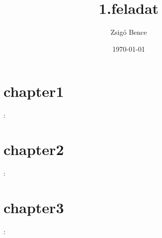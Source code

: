 \documentclass{book}
\begin{document}
\frontmatter
\title{1.feladat}
\author{Zsigó Bence}
\date{\today}
\maketitle
\tableofcontents
\mainmatter
\chapter{chapter1}
\cite{abrharber03}
\cite{knuth84}
\hulipsum:
\chapter{chapter2}
\hulipsum:
\chapter{chapter3}
\cite{bujfaz}
\hulipsum:
\backmatter
\printindex
 

\end{document}
